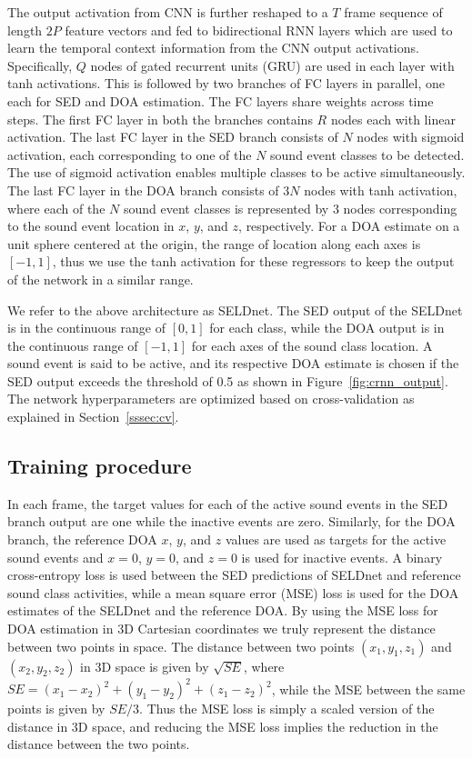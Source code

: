 \documentclass[journal]{IEEEtran}
\begin{document}
The output activation from CNN is further reshaped to a $T$ frame sequence of length $2P$ feature vectors and fed to bidirectional RNN layers which are used to learn the temporal context information from the CNN output activations.  Specifically, $Q$ nodes of gated recurrent units (GRU) are used in each layer with tanh activations. This is followed by two branches of FC layers in parallel, one each for SED and DOA estimation. The FC layers share weights across time steps. The first FC layer in both the branches contains $R$ nodes each with linear activation. The last FC layer in the SED branch consists of $N$ nodes with sigmoid activation, each corresponding to one of the $N$ sound event classes to be detected. The use of sigmoid activation enables multiple classes to be active simultaneously. The last FC layer in the DOA branch consists of $3N$ nodes with tanh activation, where each of the $N$ sound event classes is represented by $3$ nodes corresponding to the sound event location in $x$, $y$, and $z$, respectively. For a DOA estimate on a unit sphere centered at the origin, the range of location along each axes is $[-1, 1]$, thus we use the tanh activation for these regressors to keep the output of the network in a similar range. 

We refer to the above architecture as SELDnet. The SED output of the SELDnet is in the continuous range of $[0, 1]$ for each class, while the DOA output is in the continuous range of $[-1, 1]$ for each axes of the sound class location. A sound event is said to be active, and its respective DOA estimate is chosen if the SED output exceeds the threshold of 0.5 as shown in Figure~\ref{fig:crnn_output}. The network hyperparameters are optimized based on cross-validation as explained in Section~\ref{sssec:cv}.

\subsection{Training procedure}
In each frame, the target values for each of the active sound events in the SED branch output are one while the inactive events are zero. Similarly, for the DOA branch, the reference DOA $x$, $y$, and $z$ values are used as targets for the active sound events and $x=0$,  $y=0$, and $z=0$ is used for inactive events.  A binary cross-entropy loss is used between the SED predictions of SELDnet and reference sound class activities, while a mean square error (MSE) loss is used for the DOA estimates of the SELDnet and the reference DOA. By using the MSE loss for DOA estimation in 3D Cartesian coordinates we truly represent the distance between two points in space. The distance between two points $(x_1, y_1, z_1)$ and $(x_2, y_2, z_2)$ in 3D space is given by $\sqrt{SE}$, where $SE = (x_1-x_2)^2 + (y_1-y_2)^2 + (z_1-z_2)^2$, while the MSE between the same points is given by $SE/3$. Thus the MSE loss is simply a scaled version of the distance in 3D space, and reducing the MSE loss implies the reduction in the distance between the two points. 
\end{document}
